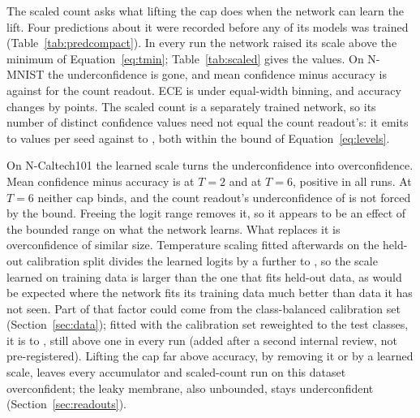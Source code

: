 \documentclass[10pt]{article}
\begin{document}
The scaled count asks what lifting the cap does when the network can learn the lift. Four
predictions about it were recorded before any of its \scRuns{} models was trained %
(Table~\ref{tab:predcompact}). In every run the network raised its scale above the minimum of
Equation~\eqref{eq:tmin}; Table~\ref{tab:scaled} gives the values. On N-MNIST the underconfidence is gone, and mean
confidence minus accuracy is \gapScNm{} against \gapCountRefScNm{} for the count readout. ECE is %
\eceWScNm{} under equal-width binning, and accuracy changes by \accDeltaScNm{} points. The scaled %
count is a separately trained network, so its number of distinct confidence values need not equal
the count readout's: it emits \levelsScMinNmTwo{} to \levelsScMaxNmTwo{} values per seed against %
\levelsCtMinNmTwo{} to \levelsCtMaxNmTwo{}, both within the bound of Equation~\eqref{eq:levels}. %

On N-Caltech101 the learned scale turns the underconfidence into overconfidence. Mean confidence minus accuracy is
\gapScNcTwo{} at $T=2$ and \gapScNcSix{} at $T=6$, positive in all \scRunsNc{} runs. At $T=6$ %
neither cap binds, and the count readout's underconfidence of \residNcFourSix{} is not forced by %
the bound. Freeing the logit range removes it, so it appears to be an effect of the bounded range
on what the network learns. What replaces it is overconfidence of similar size. Temperature scaling fitted
afterwards on the held-out calibration split divides the learned logits by a further %
\scTempNcMin{} to \scTempNcMax, so the scale learned on training data is larger than the one that
fits held-out data, as would be expected where the network fits its training data much better
than data it has not seen. Part of that factor could come from the class-balanced calibration set
(Section~\ref{sec:data}); fitted with the calibration set reweighted to the test classes, it is %
\rwScTempMin{} to \rwScTempMax, still above one in every run (added after a second internal
review, not pre-registered). Lifting the cap far above accuracy, by removing it or by a learned
scale, leaves every accumulator and scaled-count run on this dataset overconfident; the leaky
membrane, also unbounded, stays underconfident (Section~\ref{sec:readouts}).
\end{document}
